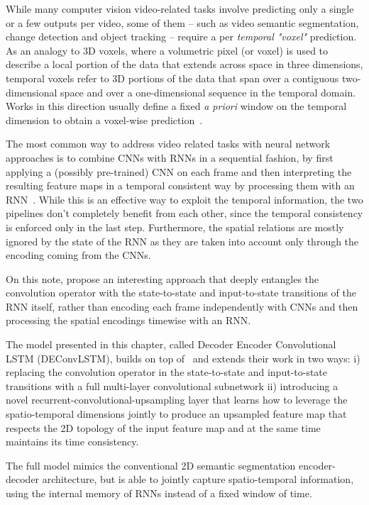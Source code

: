 While many computer vision video-related tasks involve predicting only a single
or a few outputs per video, some of them -- such as video semantic
segmentation, change detection and object tracking -- require a per
\emph{temporal "voxel"} prediction. As an analogy to 3D voxels, where a
volumetric pixel (or voxel) is used to describe a local portion of the data
that extends across space in three dimensions, temporal voxels refer to 3D
portions of the data that span over a contiguous two-dimensional space and over
a one-dimensional sequence in the temporal domain.
Works in this direction usually define a fixed \emph{ a priori} window on the
temporal dimension to obtain a voxel-wise prediction~\citep{Tran16v2v}.

The most common way to address video related tasks with neural network
approaches is to combine CNNs with RNNs in a sequential fashion, by first
applying a (possibly pre-trained) CNN on each frame and then interpreting the
resulting feature maps in a temporal consistent way by processing them with an
RNN~\cite{Donahue-et-al-arxiv2014,Vinyals-et-al-CVPR2015,Karpathy+Li-CVPR2015,
Venugopalan_2015_ICCV}. While this is an effective way to exploit the temporal
information, the two pipelines don't completely benefit from each other, since
the temporal consistency is enforced only in the last step. Furthermore, the
spatial relations are mostly ignored by the state of the RNN as they are taken
into account only through the encoding coming from the CNNs.

On this note, \cite{ShiCWYWW15} propose an interesting approach that deeply
entangles the convolution operator with the state-to-state and input-to-state
transitions of the RNN itself, rather than encoding each frame independently
with CNNs and then processing the spatial encodings timewise with an RNN.

The model presented in this chapter, called Decoder Encoder Convolutional LSTM
(DEConvLSTM), builds on top of~\cite{ShiCWYWW15} and extends their work in two
ways: i) replacing the convolution operator in the state-to-state and
input-to-state transitions with a full multi-layer convolutional subnetwork ii)
introducing a novel recurrent-convolutional-upsampling layer that learns how to
leverage the spatio-temporal dimensions jointly to produce an upsampled feature
map that respects the 2D topology of the input feature map and at the same time
maintains its time consistency.

The full model mimics the conventional 2D semantic segmentation encoder-decoder
architecture, but is able to jointly capture spatio-temporal information, using
the internal memory of RNNs instead of a fixed window of time.

